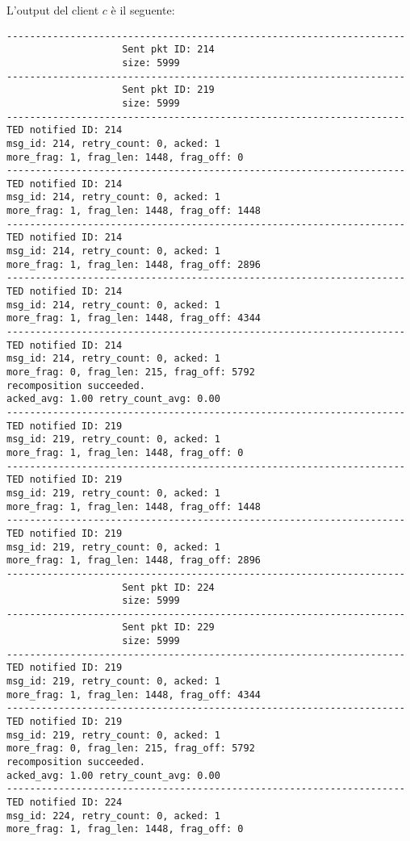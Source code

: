 \documentclass[a4paper,10pt]{article}
\begin{document}
L'output del client $c$ è il seguente:
\lstset{
	basicstyle=\ttfamily\scriptsize,
}
\begin{lstlisting}
---------------------------------------------------------------------
					Sent pkt ID: 214
					size: 5999
---------------------------------------------------------------------
					Sent pkt ID: 219
					size: 5999
---------------------------------------------------------------------
TED notified ID: 214 
msg_id: 214, retry_count: 0, acked: 1
more_frag: 1, frag_len: 1448, frag_off: 0
---------------------------------------------------------------------
TED notified ID: 214 
msg_id: 214, retry_count: 0, acked: 1
more_frag: 1, frag_len: 1448, frag_off: 1448
---------------------------------------------------------------------
TED notified ID: 214 
msg_id: 214, retry_count: 0, acked: 1
more_frag: 1, frag_len: 1448, frag_off: 2896
---------------------------------------------------------------------
TED notified ID: 214 
msg_id: 214, retry_count: 0, acked: 1
more_frag: 1, frag_len: 1448, frag_off: 4344
---------------------------------------------------------------------
TED notified ID: 214 
msg_id: 214, retry_count: 0, acked: 1
more_frag: 0, frag_len: 215, frag_off: 5792
recomposition succeeded.
acked_avg: 1.00 retry_count_avg: 0.00
---------------------------------------------------------------------
TED notified ID: 219 
msg_id: 219, retry_count: 0, acked: 1
more_frag: 1, frag_len: 1448, frag_off: 0
---------------------------------------------------------------------
TED notified ID: 219 
msg_id: 219, retry_count: 0, acked: 1
more_frag: 1, frag_len: 1448, frag_off: 1448
---------------------------------------------------------------------
TED notified ID: 219 
msg_id: 219, retry_count: 0, acked: 1
more_frag: 1, frag_len: 1448, frag_off: 2896
---------------------------------------------------------------------
					Sent pkt ID: 224
					size: 5999
---------------------------------------------------------------------
					Sent pkt ID: 229
					size: 5999
---------------------------------------------------------------------
TED notified ID: 219 
msg_id: 219, retry_count: 0, acked: 1
more_frag: 1, frag_len: 1448, frag_off: 4344
---------------------------------------------------------------------
TED notified ID: 219 
msg_id: 219, retry_count: 0, acked: 1
more_frag: 0, frag_len: 215, frag_off: 5792
recomposition succeeded.
acked_avg: 1.00 retry_count_avg: 0.00
---------------------------------------------------------------------
TED notified ID: 224 
msg_id: 224, retry_count: 0, acked: 1
more_frag: 1, frag_len: 1448, frag_off: 0

\end{lstlisting}
\end{document}
